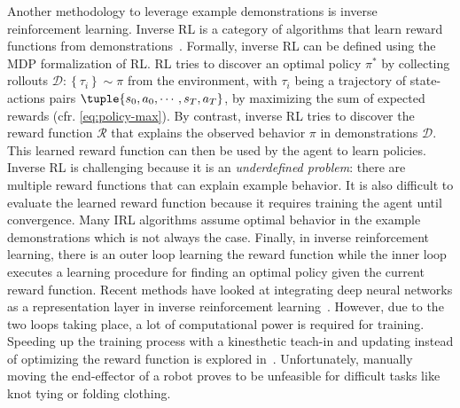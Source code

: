 \documentclass[\home/main.tex]{subfiles}
\begin{document}
Another methodology to leverage example demonstrations is inverse reinforcement learning. Inverse RL is a category of algorithms that learn reward functions from demonstrations~\autocite{Ng2000}. Formally, inverse RL can be defined using the \gls{MDP} formalization of RL. RL tries to discover an optimal policy $\pi^*$ by collecting rollouts $\mathcal{D}:\left\{\tau_{i}\right\} \sim \pi$ from the environment, with $\tau_{i}$ being a trajectory of state-actions pairs $\tuple{s_0, a_0, \cdots, s_T, a_T}$, by maximizing the sum of expected rewards (cfr. \cref{eq:policy-max}). By contrast, inverse RL tries to discover the reward function $\mathcal{R}$ that explains the observed behavior $\pi$ in demonstrations $\mathcal{D}$. This learned reward function can then be used by the agent to learn policies. Inverse RL is challenging because it is an \emph{underdefined problem}: there are multiple reward functions that can explain example behavior. It is also difficult to evaluate the learned reward function because it requires training the agent until convergence. Many IRL algorithms assume optimal behavior in the example demonstrations which is not always the case. Finally, in inverse reinforcement learning, there is an outer loop learning the reward function while the inner loop executes a learning procedure for finding an optimal policy given the current reward function. Recent methods have looked at integrating deep neural networks as a representation layer in inverse reinforcement learning~\autocite{Finn2016,Ho2016,Fu2018}. However, due to the two loops taking place, a lot of computational power is required for training. Speeding up the training process with a kinesthetic teach-in and updating instead of optimizing the reward function is explored in~\autocite{Finn2016}. Unfortunately, manually moving the end-effector of a robot proves to be unfeasible for difficult tasks like knot tying or folding clothing.
\end{document}
